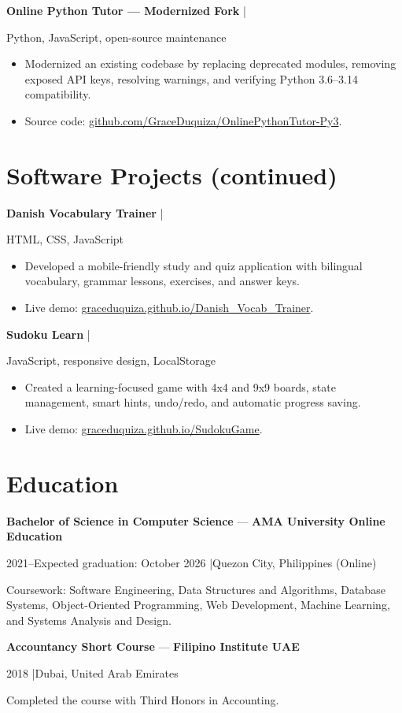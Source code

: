 \documentclass[10pt,a4paper]{article}
\newcommand{\role}[4]{%
  \textbf{#1} --- \textbf{#2}\par
  #3 \enspace|\enspace #4\par
}
\newcommand{\project}[3]{%
  \textbf{#1} \enspace|\enspace #2\par
  #3\par
}
\begin{document}
\project{Online Python Tutor --- Modernized Fork}{2025}{Python, JavaScript, open-source maintenance}
\begin{itemize}
  \item Modernized an existing codebase by replacing deprecated modules, removing exposed API keys, resolving warnings, and verifying Python 3.6--3.14 compatibility.
  \item Source code: \href{https://github.com/GraceDuquiza/OnlinePythonTutor-Py3}{github.com/GraceDuquiza/OnlinePythonTutor-Py3}.
\end{itemize}

\newpage
\section{Software Projects (continued)}
\project{Danish Vocabulary Trainer}{2025}{HTML, CSS, JavaScript}
\begin{itemize}
  \item Developed a mobile-friendly study and quiz application with bilingual vocabulary, grammar lessons, exercises, and answer keys.
  \item Live demo: \href{https://graceduquiza.github.io/Danish_Vocab_Trainer/}{graceduquiza.github.io/Danish\_Vocab\_Trainer}.
\end{itemize}

\project{Sudoku Learn}{2025}{JavaScript, responsive design, LocalStorage}
\begin{itemize}
  \item Created a learning-focused game with 4x4 and 9x9 boards, state management, smart hints, undo/redo, and automatic progress saving.
  \item Live demo: \href{https://graceduquiza.github.io/SudokuGame/}{graceduquiza.github.io/SudokuGame}.
\end{itemize}

\section{Education}
\role{Bachelor of Science in Computer Science}{AMA University Online Education}{2021--Expected graduation: October 2026}{Quezon City, Philippines (Online)}
Coursework: Software Engineering, Data Structures and Algorithms, Database Systems, Object-Oriented Programming, Web Development, Machine Learning, and Systems Analysis and Design.

\role{Accountancy Short Course}{Filipino Institute UAE}{2018}{Dubai, United Arab Emirates}
Completed the course with Third Honors in Accounting.
\end{document}
